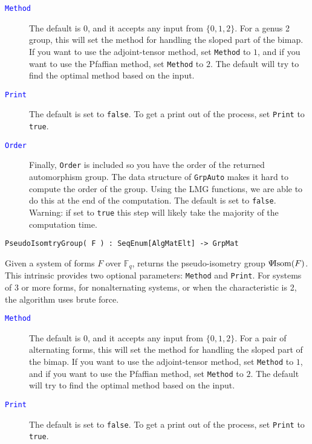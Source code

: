 \documentclass{amsart}
\DeclareMathOperator{\isom}{Isom}
\newcommand{\pseudo}{\Psi\hspace*{-1mm}\isom}
\begin{document}
\begin{description}
\item[\textcolor{blue}{\tt Method}]
The default is $0$, and it accepts any input from $\{ 0,1,2\}$. 
For a genus 2 group, this will set the method for handling the sloped part of the bimap.
If you want to use the adjoint-tensor method, set {\tt Method} to $1$, and if you want to use the Pfaffian
method, set {\tt Method} to $2$. The default will try to find the optimal method based on the input. 
\item[\textcolor{blue}{\tt Print}]
The default is set to {\tt false}. To get a print out of the process, set {\tt Print} to {\tt true}. 
\item[\textcolor{blue}{\tt Order}]
Finally, {\tt Order} is included so you have the order of the returned automorphism group. The data structure of {\tt GrpAuto} makes it hard to compute the order of the group. Using the LMG functions, we are able to do this at the end of the computation. The default is set to {\tt false}. Warning: if set to {\tt true} this step will likely take the majority of the computation time.
\end{description}

\color{blue}
\begin{verbatim}
PseudoIsomtryGroup( F ) : SeqEnum[AlgMatElt] -> GrpMat
\end{verbatim}

\color{black}
Given a system of forms $F$ over $\mathbb{F}_q$, returns the pseudo-isometry group $\pseudo(F)$.
This intrinsic provides two optional parameters: {\tt Method} and {\tt Print}. 
For systems of 3 or more forms, for nonalternating systems, or when the characteristic is 2, the algorithm uses brute force. 

\begin{description}
\item[\textcolor{blue}{\tt Method}]
The default is $0$, and it accepts any input from $\{ 0,1,2\}$. 
For a pair of alternating forms, this will set the method for handling the sloped part of the bimap.
If you want to use the adjoint-tensor method, set {\tt Method} to $1$, and if you want to use the Pfaffian
method, set {\tt Method} to $2$. The default will try to find the optimal method based on the input. 
\item[\textcolor{blue}{\tt Print}]
The default is set to {\tt false}. To get a print out of the process, set {\tt Print} to {\tt true}. 
\end{description}
\end{document}
